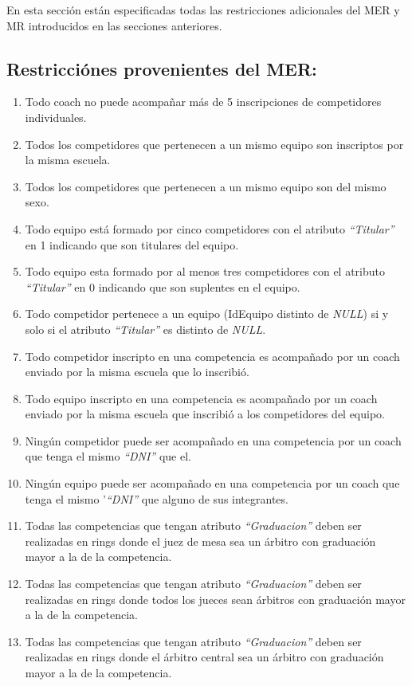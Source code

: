 En esta sección están especificadas todas las restricciones adicionales del MER y MR introducidos en las secciones anteriores.

\subsection{Restricciónes provenientes del MER:}
\begin{enumerate}
    \item Todo coach no puede acompañar más de 5 inscripciones de competidores individuales.
    \item Todos los competidores que pertenecen a un mismo equipo son inscriptos por la misma escuela.
    \item Todos los competidores que pertenecen a un mismo equipo son del mismo sexo.
    \item Todo equipo está formado por cinco competidores con el atributo \textit{``Titular''} en 1 indicando que son titulares del equipo.
    \item Todo equipo esta formado por al menos tres competidores con el atributo \textit{``Titular''} en 0 indicando que son suplentes en el equipo.
    \item Todo competidor pertenece a un equipo (IdEquipo distinto de \textit{NULL}) si y solo si el atributo \textit{``Titular''} es distinto de \textit{NULL}.
    \item Todo competidor inscripto en una competencia es acompañado por un coach enviado por la misma escuela que lo inscribió.
    \item Todo equipo inscripto en una competencia es acompañado por un coach enviado por la misma escuela que inscribió a los competidores del equipo.
    \item Ningún competidor puede ser acompañado en una competencia por un coach que tenga el mismo \textit{``DNI''} que el.
    \item Ningún equipo puede ser acompañado en una competencia por un coach que tenga el mismo '\textit{``DNI''} que alguno de sus integrantes.
    \item Todas las competencias que tengan atributo \textit{``Graduacion''} deben ser realizadas en rings donde el juez de mesa sea un árbitro con graduación mayor a la de la competencia.
    \item Todas las competencias que tengan atributo \textit{``Graduacion''} deben ser realizadas en rings donde todos los jueces sean árbitros con graduación mayor a la de la competencia.
    \item Todas las competencias que tengan atributo \textit{``Graduacion''} deben ser realizadas en rings donde el árbitro central sea un árbitro con graduación mayor a la de la competencia.

\end{enumerate}
